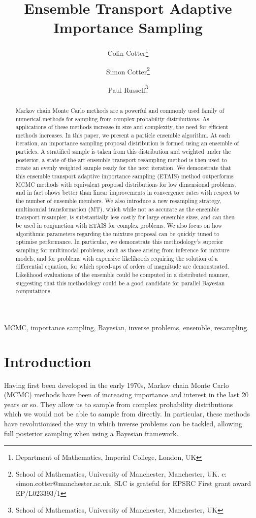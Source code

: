 \documentclass[final]{siamltex}
\author{Colin Cotter\thanks{Department of Mathematics, Imperial
    College, London, UK} \and Simon Cotter\thanks{School of
    Mathematics, University of Manchester, Manchester, UK. e:
    simon.cotter@manchester.ac.uk. SLC is grateful for EPSRC First
    grant award EP/L023393/1} \and Paul Russell\thanks{School of
    Mathematics, University of Manchester, Manchester, UK}}
\title{Ensemble Transport Adaptive Importance Sampling}
\begin{document}
\maketitle
\begin{abstract}
Markov chain Monte Carlo methods are a powerful and commonly used
  family of numerical methods for sampling from complex probability
  distributions. {\red As applications of these methods increase in size and
  complexity, the need for efficient methods increases. In this
paper, we present a particle ensemble algorithm.} At each iteration, an
  importance sampling proposal distribution is formed using an
  ensemble of particles. A stratified sample is taken from this
  distribution and weighted under the posterior, a state-of-the-art
  ensemble transport resampling method is then used to create an evenly weighted sample
  ready for the next iteration. We demonstrate that this ensemble transport
  adaptive importance sampling (ETAIS) method outperforms MCMC methods
  {\red with equivalent proposal distributions} for low dimensional problems,
  and in fact shows
  better than linear improvements in convergence rates with respect to
  the number of ensemble members. We also introduce a new resampling
  strategy, {\red multinomial transformation (MT),} which while not
  as accurate as the ensemble transport resampler, is substantially less costly for large
  ensemble sizes, and can then be used in conjunction with ETAIS for
  complex problems. We also focus on how algorithmic parameters
  regarding the mixture proposal can be quickly tuned to optimise
  performance. In particular, we demonstrate this methodology's
  superior sampling for multimodal problems, such as those arising
  from inference for mixture models, and for problems with expensive
  likelihoods requiring the solution of a differential equation, {\red
    for
  which speed-ups of orders of magnitude are demonstrated. Likelihood
  evaluations of the ensemble could be computed in a distributed
  manner, suggesting that this methodology could be a good candidate
  for parallel Bayesian computations.}
\end{abstract}
\begin{keywords}MCMC, importance sampling, Bayesian, inverse problems,
  {\red ensemble, resampling}.
\end{keywords}
\section{Introduction}
Having first been developed in the early 1970s\cite{hastings1970monte}, Markov chain Monte Carlo (MCMC) methods have been of increasing
importance and interest in the last 20 years or so. They allow us to
sample from complex probability distributions which we would not be
able to sample from directly. In particular, these methods have
revolutionised the way in which inverse problems can be tackled,
allowing full posterior sampling when using a Bayesian framework. 
\end{document}
